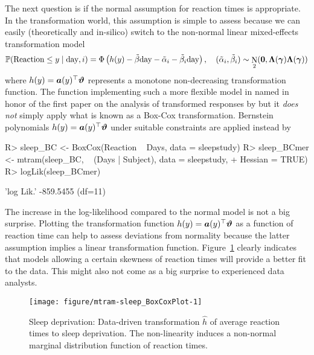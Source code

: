 \documentclass[article,nojss,shortnames]{jss}\usepackage[]{graphicx}\usepackage[]{xcolor}
\newcommand{\ry}{y}
\newcommand{\h}{h}
\newcommand{\basisy}{\avec}
\newcommand{\parm}{\varthetavec}
\newcommand{\varparm}{\gammavec}
\renewcommand{\Prob}{\mathbb{P}}
\DeclareMathOperator{\ND}{N}
\def \avec {\text{\boldmath$a$}}    \def \mA {\text{\boldmath$A$}}
\def \gammavec        {\text{\boldmath$\gamma$}}
\def \varthetavec     {\text{\boldmath$\vartheta$}}
\def \mLambda  {\mathbf{\Lambda}}
\def \nullvec {\mathbf{0}}
\begin{document}
The next question is if the normal assumption for reaction times is
appropriate. In the transformation world, this assumption is simple to
assess because we can easily (theoretically and in-silico) switch to 
the non-normal linear mixed-effects transformation model
%
\begin{eqnarray*}
\Prob(\text{Reaction} \le \ry \mid \text{day}, i) =
\Phi\left(\h(\ry) - \tilde{\beta} \text{day} - \tilde{\alpha}_i - \tilde{\beta}_i \text{day}\right),
\quad (\tilde{\alpha}_i, \tilde{\beta}_i) \sim \ND_2(\nullvec, \mLambda(\varparm) \mLambda(\varparm))
\end{eqnarray*}
%
where $\h(\ry) = \basisy(\ry)^\top \parm$ represents a monotone non-decreasing
transformation function. The function implementing such a more flexible
model in named in honor of the first paper on the analysis of
transformed responses by \cite{BoxCox_1964} but it \emph{does not} simply apply
what is known as a Box-Cox transformation. Bernstein polynomials
$\h(\ry) = \basisy(\ry)^\top \parm$ under suitable constraints 
\citep{Hothorn_Moest_Buehlmann_2017} are applied instead by
\begin{Schunk}
\begin{Sinput}
R> sleep_BC <- BoxCox(Reaction ~ Days, data = sleepstudy)
R> sleep_BCmer <- mtram(sleep_BC, ~ (Days | Subject), data = sleepstudy, 
+                       Hessian = TRUE)
R> logLik(sleep_BCmer)
\end{Sinput}
\begin{Soutput}
'log Lik.' -859.5455 (df=11)
\end{Soutput}
\end{Schunk}
%
The increase in the log-likelihood compared to the normal model is not a big
surprise.  Plotting the transformation function $\h(\ry) = \basisy(\ry)^\top \parm$ as
a function of reaction time can help to assess deviations from normality
because the latter assumption implies a linear transformation function. 
Figure~\ref{fig:sleepstudy_trafo} clearly indicates that models allowing a
certain skewness of reaction times will provide a better fit to the data.
This might also not come as a big surprise to experienced data analysts.

\begin{figure}[t]
\begin{Schunk}


{\centering \texttt{[image: figure/mtram-sleep\_BoxCoxPlot-1]} 

}

\end{Schunk}
\caption{Sleep deprivation: Data-driven transformation $\hat{\h}$ 
         of average reaction times to sleep deprivation. The non-linearity
         induces a non-normal marginal distribution function of reaction times.
         \label{fig:sleepstudy_trafo}}
\end{figure}
\end{document}
